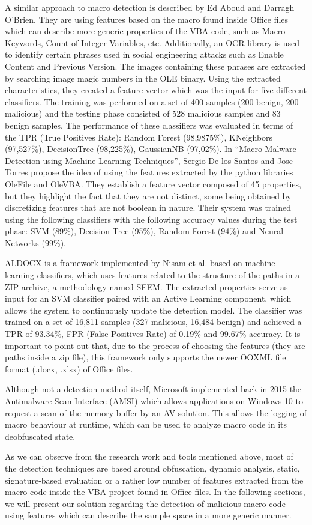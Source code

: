 A similar approach to macro detection is described by Ed Aboud and Darragh O'Brien. They are using features based on the macro found inside Office files which can describe more generic properties of the VBA code, such as Macro Keywords, Count of Integer Variables, etc. Additionally, an OCR library is used to identify certain phrases used in social engineering attacks such as Enable Content and Previous Version. The images containing these phrases are extracted by searching image magic numbers in the OLE binary. Using the extracted characteristics, they created a feature vector which was the input for five different classifiers. The training was performed on a set of 400 samples (200 benign, 200 malicious) and the testing phase consisted of 528 malicious samples and 83 benign samples. The performance of these classifiers was evaluated in terms of the TPR (True Positives Rate): Random Forest (98,9875\%), KNeighbors (97,527\%), DecisionTree (98,225\%), GaussianNB (97,02\%).
In “Macro Malware Detection using Machine Learning Techniques”, Sergio De los Santos and Jose Torres propose the idea of using the features extracted by the python libraries OleFile and OleVBA. They establish a feature vector composed of 45 properties, but they highlight the fact that they are not distinct, some being obtained by discretizing features that are not boolean in nature. Their system was trained  using the following classifiers with the following accuracy values during the test phase: SVM (89\%),  Decision Tree (95\%), Random Forest (94\%) and Neural Networks (99\%). 
\par
ALDOCX is a framework implemented by Nisam et al. based on machine learning classifiers, which uses features related to the structure of the paths in a ZIP archive, a methodology named SFEM. The extracted properties serve as input for an SVM classifier paired with an Active Learning component, which allows the system to continuously update the detection model. The classifier was trained on a set of 16,811 samples (327 malicious, 16,484 benign) and achieved a TPR of 93.34\%, FPR (False Positives Rate) of 0.19\% and 99.67\% accuracy. It is important to point out that, due to the process of choosing the features (they are paths inside a zip file), this framework only supports the newer OOXML file format (.docx, .xlsx) of Office files.
\par
Although not a detection method itself, Microsoft implemented back in 2015 the Antimalware Scan Interface (AMSI) which allows applications on Windows 10 to request a scan of the memory buffer by an AV solution. This allows the logging of macro behaviour at runtime, which can be used to analyze macro code in its deobfuscated state.
\par
As we can observe from the research work and tools mentioned above, most of the detection techniques are based around obfuscation, dynamic analysis, static, signature-based evaluation or a rather low number of features extracted from the macro code inside the VBA project found in Office files.
In the following sections, we will present our solution regarding the detection of malicious macro code using features which can describe the sample space in a more generic manner.